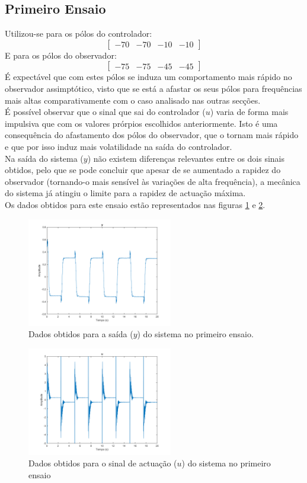 \documentclass[%
  reprint,
  nofootinbib,
  amsmath,amssymb,
  aps,
  10pt,
  a4paper
]{revtex4-1}
\begin{document}
\subsection{Primeiro Ensaio}
Utilizou-se para os pólos do controlador:
\begin{equation}
\begin{bmatrix}
-70 & -70  & -10 &-10
\end{bmatrix}
\end{equation}
E para os pólos do observador:
\begin{equation}
\begin{bmatrix}
-75 & -75  & -45 &-45
\end{bmatrix}
\end{equation}
É expectável que com estes pólos se induza um comportamento mais rápido no observador assimptótico, visto que se está a afastar os seus pólos para frequências mais altas comparativamente com o caso analisado nas outras secções.\\
É possível observar que o sinal que sai do controlador ($u$) varia de forma mais impulsiva que com os valores prórpios escolhidos anteriormente. Isto é uma consequência do afastamento dos pólos do observador, que o tornam mais rápido e que por isso induz mais volatilidade na saída do controlador.\\
Na saída do sistema ($y$) não existem diferenças relevantes entre os dois sinais obtidos, pelo que se pode concluir que apesar de se aumentado a rapidez do observador (tornando-o mais sensível às variações de alta frequência), a mecânica do sistema já atingiu o limite para a rapidez de actuação máxima.\\
Os dados obtidos para este ensaio estão representados nas figuras \ref{fig:y_pri} e \ref{fig:u_pri}.
\begin{figure}
\includegraphics[width=2.5in]{../imgs/dados_00_a/dados_00_a_y.png}
\caption{Dados obtidos para a saída ($y$) do sistema no primeiro ensaio.}
\label{fig:y_pri}
\end{figure}
\begin{figure}
\includegraphics[width=2.5in]{../imgs/dados_00_a/dados_00_a_u.png}
\caption{Dados obtidos para o sinal de actuação ($u$) do sistema no primeiro ensaio}
\label{fig:u_pri}
\end{figure}
\end{document}
